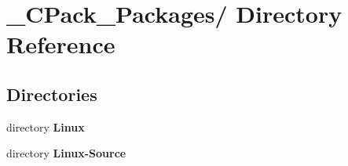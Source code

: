 \section{\_\-CPack\_\-Packages/ Directory Reference}
\label{dir_949d36cfafaa4e6950844749aa080626}
\subsection*{Directories}
\begin{DoxyCompactItemize}
\item 
directory {\bf Linux}
\item 
directory {\bf Linux-\/Source}
\end{DoxyCompactItemize}
